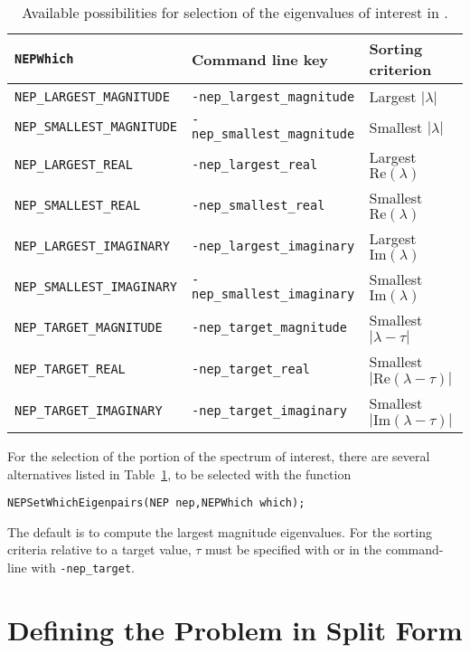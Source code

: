 \begin{table}
\centering
{\small \begin{tabular}{lll}
\texttt{NEPWhich}                  & Command line key                   & Sorting criterion \\\hline
\texttt{NEP\_LARGEST\_MAGNITUDE}   & \texttt{-nep\_largest\_magnitude}  & Largest $|\lambda|$ \\
\texttt{NEP\_SMALLEST\_MAGNITUDE}  & \texttt{-nep\_smallest\_magnitude} & Smallest $|\lambda|$ \\
\texttt{NEP\_LARGEST\_REAL}        & \texttt{-nep\_largest\_real}       & Largest $\mathrm{Re}(\lambda)$ \\
\texttt{NEP\_SMALLEST\_REAL}       & \texttt{-nep\_smallest\_real}      & Smallest $\mathrm{Re}(\lambda)$ \\
\texttt{NEP\_LARGEST\_IMAGINARY}   & \texttt{-nep\_largest\_imaginary}  & Largest $\mathrm{Im}(\lambda)$ \\
\texttt{NEP\_SMALLEST\_IMAGINARY}  & \texttt{-nep\_smallest\_imaginary} & Smallest $\mathrm{Im}(\lambda)$ \\\hline
\texttt{NEP\_TARGET\_MAGNITUDE}    & \texttt{-nep\_target\_magnitude}   & Smallest $|\lambda-\tau|$ \\
\texttt{NEP\_TARGET\_REAL}         & \texttt{-nep\_target\_real}        & Smallest $|\mathrm{Re}(\lambda-\tau)|$ \\
\texttt{NEP\_TARGET\_IMAGINARY}    & \texttt{-nep\_target\_imaginary}   & Smallest $|\mathrm{Im}(\lambda-\tau)|$ \\\hline
\end{tabular} }
\caption{\label{tab:portionn}Available possibilities for selection of the eigenvalues of interest in .}
\end{table}

	For the selection of the portion of the spectrum of interest, there are several alternatives listed in Table~\ref{tab:portionn}, to be selected with the function
	\begin{Verbatim}[fontsize=\small]
	NEPSetWhichEigenpairs(NEP nep,NEPWhich which);
	\end{Verbatim}
The default is to compute the largest magnitude eigenvalues.
For the sorting criteria relative to a target value, $\tau$ must be specified with  or in the command-line with \Verb!-nep_target!.

\section{\label{sec:nepsplit}Defining the Problem in Split Form}

